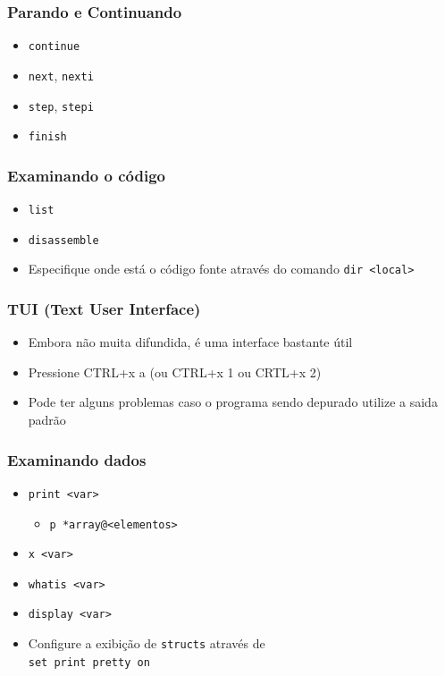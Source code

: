 \documentclass[xcolor=pdftex,dvipsnames,table,t]{beamer}
\begin{document}
\begin{frame}
	\frametitle{Parando e Continuando}
	  \begin{itemize}
	    \item \texttt{continue}
	    \item \texttt{next}, \texttt{nexti}
	    \item \texttt{step}, \texttt{stepi}
	    \item \texttt{finish}
	  \end{itemize}
\end{frame}

\begin{frame}
	\frametitle{Examinando o código}
	  \begin{itemize}
	    \item \texttt{list}
	    \item \texttt{disassemble}
	    \item Especifique onde está o código fonte através do comando \texttt{dir <local>}
	  \end{itemize}
\end{frame}

\begin{frame}
	\frametitle{TUI (Text User Interface)}
	  \begin{itemize}
	    \item Embora não muita difundida, é uma interface bastante útil
	    \item Pressione CTRL+x a (ou CTRL+x 1 ou CRTL+x 2)
	    \item Pode ter alguns problemas caso o programa sendo depurado utilize a saida padrão
	  \end{itemize}
\end{frame}

\begin{frame}
	\frametitle{Examinando dados}
	  \begin{itemize}
	    \item \texttt{print <var>}
	    \begin{itemize}
	      \item \texttt{p *array@<elementos>}
	    \end{itemize}
	    \item \texttt{x <var>}
	    \item \texttt{whatis <var>}
	    \item \texttt{display <var>}
	    \item Configure a exibição de \texttt{structs} através de \\
		  \texttt{set print pretty on}
	  \end{itemize}
\end{frame}
\end{document}
